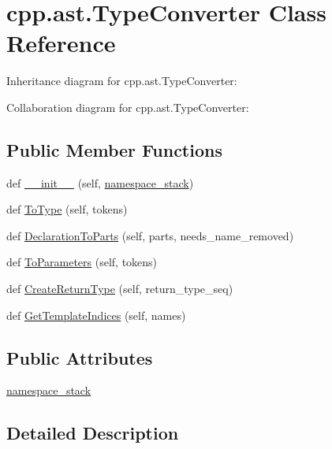 \hypertarget{classcpp_1_1ast_1_1_type_converter}{}\section{cpp.\+ast.\+Type\+Converter Class Reference}
\label{classcpp_1_1ast_1_1_type_converter}


Inheritance diagram for cpp.\+ast.\+Type\+Converter\+:


Collaboration diagram for cpp.\+ast.\+Type\+Converter\+:
\subsection*{Public Member Functions}
\begin{DoxyCompactItemize}
\item 
def \hyperlink{classcpp_1_1ast_1_1_type_converter_ae6e75773d6722cdbb96d510a49cb633a}{\+\_\+\+\_\+init\+\_\+\+\_\+} (self, \hyperlink{classcpp_1_1ast_1_1_type_converter_abb739f15c6cd0800e07c086c2b30833e}{namespace\+\_\+stack})
\item 
def \hyperlink{classcpp_1_1ast_1_1_type_converter_aa6ea82e40cd30e5dfcd471ff144a19cf}{To\+Type} (self, tokens)
\item 
def \hyperlink{classcpp_1_1ast_1_1_type_converter_a7c9d20d107c2bc0eb80afdf04957825f}{Declaration\+To\+Parts} (self, parts, needs\+\_\+name\+\_\+removed)
\item 
def \hyperlink{classcpp_1_1ast_1_1_type_converter_aeaf27fb1890f65d7216703df610b46d5}{To\+Parameters} (self, tokens)
\item 
def \hyperlink{classcpp_1_1ast_1_1_type_converter_a7e4d429131d9d5742ec44c78b61beb87}{Create\+Return\+Type} (self, return\+\_\+type\+\_\+seq)
\item 
def \hyperlink{classcpp_1_1ast_1_1_type_converter_a7b5244be5a0caedd769ae866f8a182aa}{Get\+Template\+Indices} (self, names)
\end{DoxyCompactItemize}
\subsection*{Public Attributes}
\begin{DoxyCompactItemize}
\item 
\hyperlink{classcpp_1_1ast_1_1_type_converter_abb739f15c6cd0800e07c086c2b30833e}{namespace\+\_\+stack}
\end{DoxyCompactItemize}


\subsection{Detailed Description}


